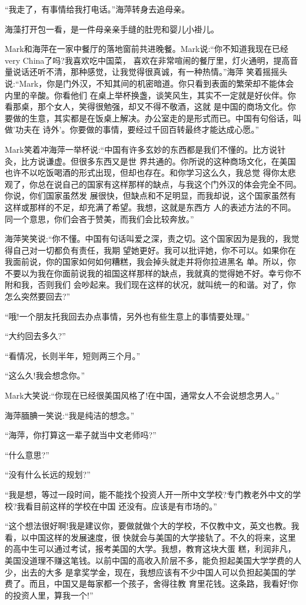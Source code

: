 \documentclass[11pt,a4paper,onecolumn]{article}
\begin{document}
``我走了，有事情给我打电话。''海萍转身去追母亲。

海藻打开包一看，是一件母亲亲手缝的肚兜和婴儿小褂儿。

Mark和海萍在一家中餐厅的落地窗前共进晚餐。Mark说:``你不知道我现在已经very China了吗?我喜欢吃中国菜，
喜欢在非常喧闹的餐厅里，灯火通明，提高音量说话还听不清，那种感觉，让我觉得很真诚，有一种热情。''海萍
笑着摇摇头说:``Mark，你是门外汉，不知其间的机密暗道。你只看到表面的繁荣却不能体会内里的辛酸。你看他们
在桌上举杯换盏，谈笑风生，其实不一定就是好伙伴。你看那桌，那个女人，笑得很勉强，却又不得不敬酒，这就
是中国的商场文化。你要做的生意，其实都是在饭桌上解决。办公室走的是形式而已。中国有句俗话，叫做'功夫在
诗外'。你要做的事情，要经过千回百转最终才能达成心愿。''

Mark笑着冲海萍一举杯说:``中国有许多玄妙的东西都是我们不懂的。比方说针灸，比方说谦虚。但很多东西又是世
界共通的。你所说的这种商场文化，在美国也许不以吃饭喝酒的形式出现，但却也存在。和你学习这么久，我总觉
得你太悲观了，你总在说自己的国家有这样那样的缺点，与我这个门外汉的体会完全不同。你说，你们国家虽然发
展很快，但缺点和不足明显，而我却说，这个国家虽然有这样或那样的不足，却充满了希望。我想，这就是东西方
人的表述方法的不同。同一个意思，你们会吝于赞美，而我们会比较奔放。''

海萍笑笑说:``你不懂。中国有句话叫爱之深，责之切。这个国家因为是我的，我觉得自己对一切都负有责任，我期
望她更好。我可以批评她，你不可以。如果你在我面前说，你的国家如何如何糟糕，我会掉头就走并将你拉进黑名
单。所以，你不要以为我在你面前说我的祖国这样那样的缺点，我就真的觉得她不好。幸亏你不附和我，否则我们
会吵起来。我们现在这样的状况，就叫统一的和谐。对了，你怎么突然要回去?''

``哦!一个朋友托我回去办点事情，另外也有些生意上的事情要处理。''

``大约回去多久?''

``看情况，长则半年，短则两三个月。''

``这么久!我会想念你。''

Mark大笑说:``你现在已经很美国风格了!在中国，通常女人不会说想念男人。''

海萍腼腆一笑说:``我是纯洁的想念。''

``海萍，你打算这一辈子就当中文老师吗?''

``什么意思?''

``没有什么长远的规划?''

``我是想，等过一段时间，能不能找个投资人开一所中文学校?专门教老外中文的学校?我看目前这样的学校在中国
还没有。应该是有市场的。''

``这个想法很好啊!我是建议你，要做就做个大的学校，不仅教中文，英文也教。我看，以中国这样的发展速度，很
快就会与美国的大学接轨了。不久的将来，这里的高中生可以通过考试，报考美国的大学。我想，教育这块大蛋
糕，利润非凡，美国没道理不赚这笔钱。以前中国的高收入阶层不多，能负担起美国大学学费的人少，出去的大多
是拿奖学金，现在，我想应该有不少中国人可以负担起美国的学费了。而且，中国又是每家都一个孩子，舍得往教
育里花钱。这条路，我看好!你的投资人里，算我一个!''
\end{document}
